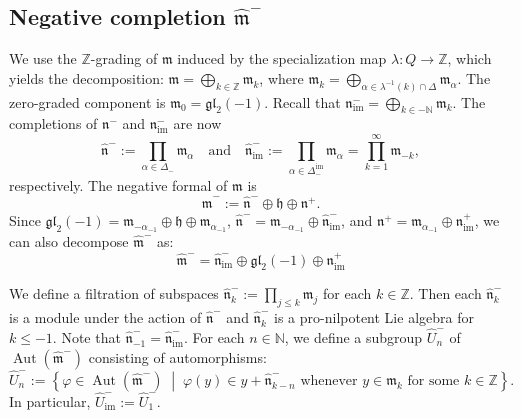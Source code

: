 \documentclass[11pt,letterpaper]{amsart}
\numberwithin{thecounter}{section}
\theoremstyle{definition}
\DeclareMathOperator{\im}{{im}}
\newcommand{\m}{{\mathfrak{m}}}
\begin{document}
\begin{longver}
\subsection{Negative completion $\widehat{\mathfrak{m}}^-$}

We use the $\mathbb{Z}$-grading of  $\mathfrak{m}$ induced by the specialization map $\lambda: Q \to \mathbb{Z}$, which yields the decomposition:
$\mathfrak{m} = \bigoplus_{k \in \mathbb{Z}} \mathfrak{m}_k $, 
where $\mathfrak{m}_k = \bigoplus_{\alpha \in \lambda^{-1}(k) \cap \Delta} \mathfrak{m}_\alpha$. The zero-graded component is $\mathfrak{m}_0 = \mathfrak{gl}_2(-1)$. Recall that  $\mathfrak{n}_{\im}^{-} = \bigoplus_{k \in -\mathbb{N}} \mathfrak{m}_k$.
The completions of $\mathfrak{n}^-$ and $\mathfrak{n}_{\im}^-$ are now
\[ 
\widehat{\mathfrak{n}}^- := \prod_{\alpha \in \Delta_-} \mathfrak{m}_\alpha \quad \text{and} \quad \widehat{\mathfrak{n}}_{\im}^- := \prod_{\alpha \in \Delta_-^{\im}} \mathfrak{m}_\alpha  = \prod_{k=1}^\infty \mathfrak{m}_{-k} ,
\]
respectively. The negative formal of $\m$ is
\[ 
\widehat{\mathfrak{m}}^- := \widehat{\mathfrak{n}}^- \oplus \mathfrak{h} \oplus \mathfrak{n}^+.
\]
Since $\mathfrak{gl}_2(-1) = \mathfrak{m}_{-\alpha_{-1}} \oplus \mathfrak{h} \oplus \mathfrak{m}_{\alpha_{-1}}$, $\widehat{\mathfrak{n}}^- = \mathfrak{m}_{-\alpha_{-1}} \oplus \widehat{\mathfrak{n}}_{\im}^-$, and $\mathfrak{n}^+ = \mathfrak{m}_{\alpha_{-1}} \oplus \mathfrak{n}_{\im}^+$, we can also decompose $\widehat{\mathfrak{m}}^-$ as:
\[ 
\widehat{\mathfrak{m}}^- = \widehat{\mathfrak{n}}_{\im}^- \oplus \mathfrak{gl}_2(-1) \oplus \mathfrak{n}_{\im}^+ 
\]

We define a filtration of  subspaces 
\(
\widehat{\mathfrak{n}}_k^- := \prod_{j \le k} \mathfrak{m}_{j} 
\)
for each $k \in \mathbb{Z}$.
Then each $\widehat{\mathfrak{n}}_k^-$ is a module under the action of $\widehat{\mathfrak{n}}^-$ and $\widehat{\mathfrak{n}}_k^-$ is a pro-nilpotent Lie algebra for $k\leq -1$.
Note that  $\widehat{\mathfrak{n}}_{-1}^- = \widehat{\mathfrak{n}}_{\im}^-$.
For each $n \in \mathbb{N}$, we define a subgroup $\widehat{U}_n^-$ of $\operatorname{Aut}(\widehat{\mathfrak{m}}^-)$ consisting of automorphisms:
\[ 
\widehat{U}_n^- := \left\{ \varphi \in \operatorname{Aut}(\widehat{\mathfrak{m}}^-) \;\middle|\; \varphi(y) \in y + \widehat{\mathfrak{n}}_{k-n}^- \text{ whenever } y \in \mathfrak{m}_k \text{ for some } k \in \mathbb{Z} \right\} .
\]
In particular,
\(
\widehat{U}_{\im}^- := \widehat{U}_1^- .
\)


\end{longver}
\end{document}
